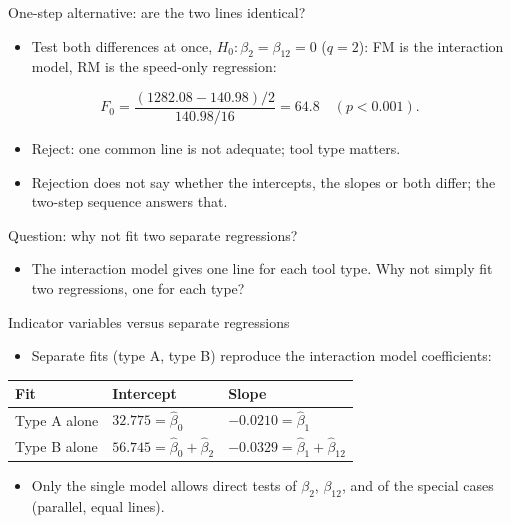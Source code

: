\begin{frame}{One-step alternative: are the two lines identical?}
    \begin{itemize}
        \item Test both differences at once, $H_0\colon \beta_2 = \beta_{12} = 0$ ($q = 2$): FM is the interaction model, RM is the speed-only regression:
    \end{itemize}
    \[
        F_0 = \frac{(1282.08 - 140.98)/2}{140.98/16} = 64.8 \quad (p < 0.001).
    \]
    \begin{itemize}
        \item Reject: one common line is not adequate; tool type matters.
        \item Rejection does not say whether the intercepts, the slopes or both differ; the two-step sequence answers that.
    \end{itemize}
\end{frame}


\begin{frame}{Question: why not fit two separate regressions?}
    \begin{itemize}
        \item The interaction model gives one line for each tool type. Why not simply fit two regressions, one for each type?
    \end{itemize}
\end{frame}


\begin{frame}{Indicator variables versus separate regressions}
    \begin{itemize}
        \item Separate fits (type A, type B) reproduce the interaction model coefficients:
    \end{itemize}
    \centering
    \small
    \begin{tabular}{lll}
        \toprule
        Fit & Intercept & Slope \\
        \midrule
        Type A alone & $32.775 = \hat{\beta}_0$ & $-0.0210 = \hat{\beta}_1$ \\
        Type B alone & $56.745 = \hat{\beta}_0 + \hat{\beta}_2$ & $-0.0329 = \hat{\beta}_1 + \hat{\beta}_{12}$ \\
        \bottomrule
    \end{tabular}

    \vspace{0.8em}
    \raggedright
    \begin{itemize}
        \item Only the single model allows direct tests of $\beta_2$, $\beta_{12}$, and of the special cases (parallel, equal lines).
    \end{itemize}
\end{frame}


